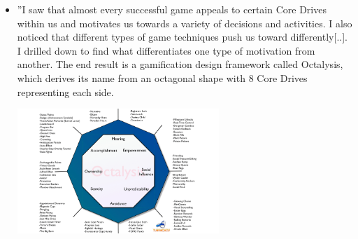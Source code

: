\begin{itemize}
    \item ''I saw that almost every successful game appeals to certain Core Drives within us and motivates us towards a variety of decisions and activities. I also noticed that different types of game techniques push us toward differently[..]. I drilled down to find what differentiates one type of motivation from another. The end result is a gamification design framework called Octalysis, which derives its name from an octagonal shape with 8 Core Drives representing each side.
    \begin{center}
            \includegraphics[width= 0.6\textwidth]{images/octaysis-gamification-framework.png}
    \end{center}
\end{itemize}

